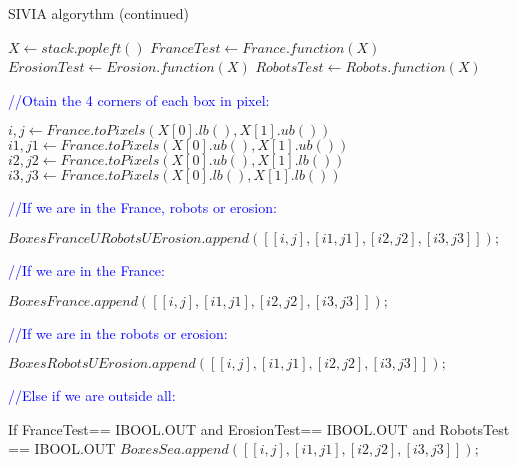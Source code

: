 \begin{algorithm}
  \caption{SIVIA algorythm (continued)}
  \begin{algorithmic}
  
	
		\vspace{0.3 cm}
	
  		\State $X\gets stack.popleft()$
		\State $FranceTest\gets France.function(X)$
		\State $ErosionTest\gets Erosion.function(X)$ 
		\State $RobotsTest\gets Robots.function(X)$

		\vspace{0.3 cm}

  		\textcolor{blue}{//Otain the 4 corners of each box in pixel:}\
  		 
  		
  		\State $i,j\gets France.toPixels(X[0].lb(),X[1].ub())$
		\State $i1,j1\gets France.toPixels(X[0].ub(),X[1].ub())$
		\State $i2,j2\gets France.toPixels(X[0].ub(),X[1].lb())$ 
		\State $i3,j3\gets France.toPixels(X[0].lb(),X[1].lb())$
  
		\vspace{0.3 cm}
		
	 	\textcolor{blue}{//If we are in the France, robots or erosion:}\
	 	

     		\State $BoxesFranceURobotsUErosion.append([[i,j],[i1,j1],[i2,j2],[i3,j3]]);$
     		
     		\vspace{0.3 cm}
     	
     	\textcolor{blue}{//If we are in the France:}\
	 	 
     		\State $BoxesFrance.append([[i,j],[i1,j1],[i2,j2],[i3,j3]]);$
	 	\EndIf
	 	
	 	\vspace{0.3 cm}
	 	
	 	\textcolor{blue}{//If we are in the robots or erosion:}\
	 	 
     		\State $BoxesRobotsUErosion.append([[i,j],[i1,j1],[i2,j2],[i3,j3]]);$
	 	 
	
	 	 \EndIf
	 	 
	 	 \vspace{0.3 cm}
     		
     	

     	
     	\textcolor{blue}{//Else if we are outside all:}\
     
	 	 
	 	 \ElsIf If{ FranceTest== IBOOL.OUT and  ErosionTest== IBOOL.OUT and RobotsTest == IBOOL.OUT}
	 	 \State $BoxesSea.append([[i,j],[i1,j1],[i2,j2],[i3,j3]]);$
	 	 

\end{algorithmic}
\end{algorithm}

